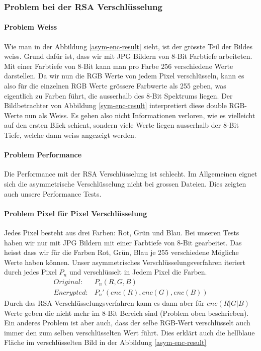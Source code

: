 \documentclass[paper=a4,fontsize=12pt]{scrartcl}
\begin{document}
\subsubsection{Problem bei der RSA Verschlüsselung} \label{problems-RSA}
\paragraph{Problem Weiss} \label{problem-white}
Wie man in der Abbildung \ref{asym-enc-result} sieht, ist der grösste Teil
der Bildes weiss.
Grund dafür ist, dass wir mit JPG Bildern von 8-Bit Farbtiefe arbeiteten.
Mit einer Farbtiefe von 8-Bit kann man pro Farbe 256 verschiedene Werte darstellen.
Da wir nun die RGB Werte von jedem Pixel verschlüsseln, kann es also für die einzelnen
RGB Werte grössere Farbwerte als 255 geben, was eigentlich zu Farben führt,
die ausserhalb des 8-Bit Spektrums liegen.
Der Bildbetrachter von Abbildung \ref{sym-enc-result} interpretiert diese double 
RGB-Werte nun als Weiss. 
Es gehen also nicht Informationen verloren, wie es vielleicht auf den ersten Blick schient,
sondern viele Werte liegen ausserhalb der 8-Bit Tiefe, welche dann weiss angezeigt werden.

\paragraph{Problem Performance} Die Performance mit der RSA Verschlüsselung ist schlecht.
Im Allgemeinen eignet sich die asymmetrische Verschlüsselung nicht bei grossen Dateien.
Dies zeigten auch unsere Performance Tests.

\paragraph{Problem Pixel für Pixel Verschlüsselung} 
Jedes Pixel besteht aus drei Farben: Rot, Grün und Blau.
Bei unseren Tests haben wir nur mit JPG Bildern mit einer Farbtiefe von 8-Bit gearbeitet.
Das heisst dass wir für die Farben Rot, Grün, Blau je 255 verschiedene Mögliche Werte haben können.
Unser asymmetrisches Verschlüsselungsverfahren iteriert durch jedes Pixel $P_n$ und verschlüsselt
in Jedem Pixel die Farben.
\begin{align} 
Original: &P_n(R,G,B) \\
Encrypted: &P_n'(enc(R), enc(G), enc(B))
\end{align}
Durch das RSA Verschlüsselungsverfahren kann es dann aber für $enc(R|G|B)$ Werte geben die nicht mehr
im 8-Bit Bereich sind (Problem oben beschrieben).
Ein anderes Problem ist aber auch, dass der selbe RGB-Wert verschlüsselt auch immer den zum selben
verschlüsselten Wert führt. Dies erklärt auch die hellblaue Fläche im verschlüsselten Bild 
in der Abbildung \ref{asym-enc-result}
\end{document}
